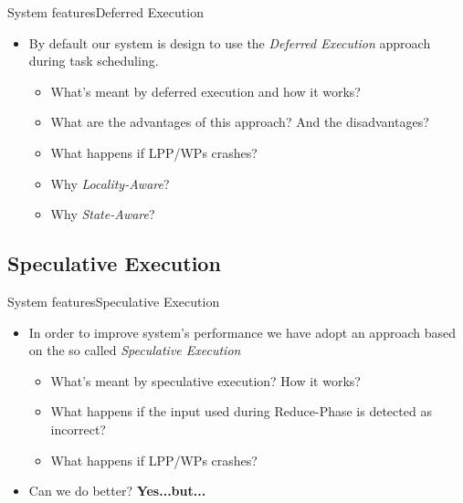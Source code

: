 \documentclass[10pt]{beamer}
\begin{document}
\begin{frame}{System features}{Deferred Execution}

\begin{itemize}
\item By default our system is design to use the \textit{Deferred Execution} approach during task scheduling.

\vspace{10pt}
\begin{itemize}
\item What's meant by deferred execution and how it works?

\item What are the advantages of this approach? And the disadvantages?

\item What happens if LPP/WPs crashes?

\item Why \textit{Locality-Aware}?

\item Why \textit{State-Aware}?
\end{itemize}
\vspace{10pt}
\end{itemize}
\end{frame}

\subsection{Speculative Execution}

\begin{frame}{System features}{Speculative Execution}

\begin{itemize}

\item In order to improve system's performance we have adopt an approach based on the so called \textit{Speculative Execution}
\vspace{10pt}
\begin{itemize}
\item What's meant by speculative execution? How it works?

\item What happens if the input used during Reduce-Phase is detected as incorrect?

\item What happens if LPP/WPs crashes?
\end{itemize}
\vspace{10pt}
\item Can we do better? \textbf{Yes...but...}
\end{itemize}

\end{frame}
\end{document}
